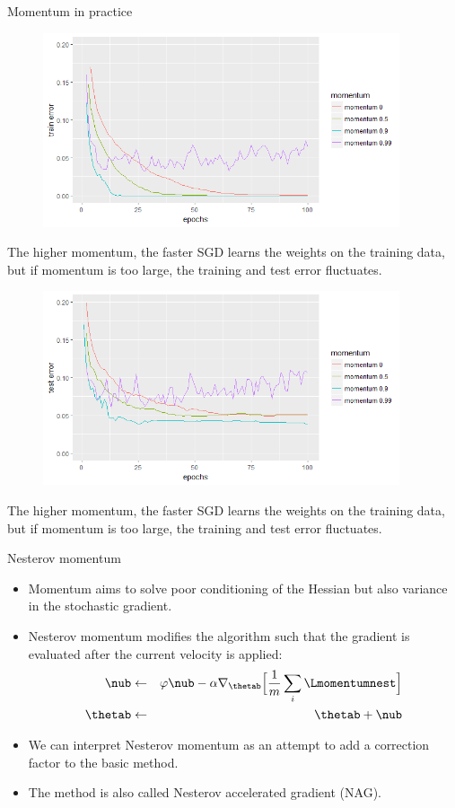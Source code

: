 \begin{vbframe}{Momentum in practice}
  \begin{figure}
  \begin{center}
    \includegraphics[width=10.5cm]{figure/momentum_train.png}
    \end{center}
  \end{figure}
    \small{The higher momentum, the faster SGD learns the weights on the training data, but if momentum is too large, the training and test error fluctuates.}

\framebreak

  \begin{figure}
  \centering
    \includegraphics[width=10.5cm]{figure/momentum_test.png}
  \end{figure}
      \small{The higher momentum, the faster SGD learns the weights on the training data, but if momentum is too large, the training and test error fluctuates.}
\end{vbframe}


\begin{vbframe}{Nesterov momentum}
  \begin{itemize}
    \item Momentum aims to solve poor conditioning of the Hessian but also variance in the stochastic gradient.
    \item Nesterov momentum modifies the algorithm such that the gradient is evaluated after the current velocity is applied:
      \begin{eqnarray*} 
        \nub &\leftarrow& \varphi \nub - \alpha \nabla_{\thetab} \Big[\frac{1}{m} \sum_{i} \Lmomentumnest \Big] \\
        \thetab &\leftarrow& \thetab + \nub
      \end{eqnarray*}
    \item We can interpret Nesterov momentum as an attempt to add a correction factor to the basic method.
    \item The method is also called Nesterov accelerated gradient (NAG).
  \end{itemize}
\end{vbframe}

